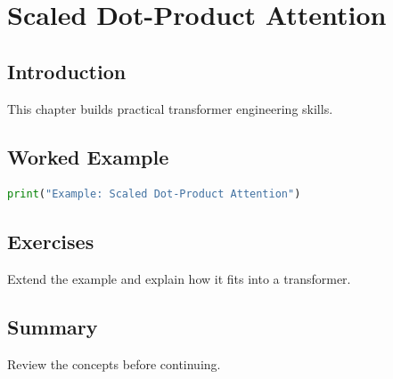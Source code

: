\chapter{Scaled Dot-Product Attention}
\label{chap:vol8-16}



\section{Introduction}
This chapter builds practical transformer engineering skills.

\section{Worked Example}
\begin{lstlisting}[language=Python]
print("Example: Scaled Dot-Product Attention")
\end{lstlisting}

\section{Exercises}
\begin{exercise}
Extend the example and explain how it fits into a transformer.
\end{exercise}

\section{Summary}
Review the concepts before continuing.
